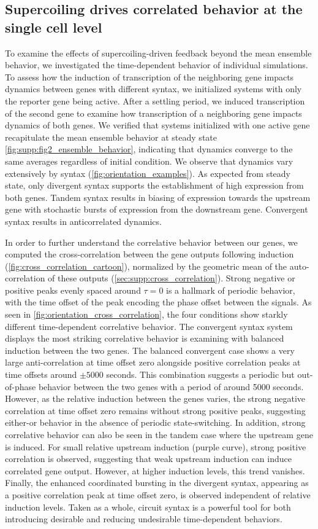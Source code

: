 \documentclass[11pt]{article}
\begin{document}
\subsection{Supercoiling drives correlated behavior at the single cell level}
To examine the effects of supercoiling-driven feedback beyond the mean ensemble behavior, we investigated the time-dependent behavior of individual simulations. To assess how the induction of transcription of the neighboring gene impacts dynamics between genes with different syntax,
we initialized systems  with only the reporter gene being active. After a settling period, we induced transcription of the second gene to examine how transcription of a neighboring gene impacts dynamics of both genes. We verified that systems initialized with one active gene recapitulate the mean ensemble behavior at steady state \cref{fig:supp:fig2_ensemble_behavior}, indicating that dynamics converge to the same averages regardless of initial condition. We observe that dynamics vary extensively by syntax (\cref{fig:orientation_examples}). As expected from steady state, only divergent syntax supports the establishment of high expression from both genes. Tandem syntax results in biasing of expression towards the upstream gene with stochastic bursts of expression from the downstream gene. Convergent syntax results in anticorrelated dynamics. 

In order to further understand the correlative behavior between our genes, we computed the cross-correlation between the gene outputs following induction (\cref{fig:cross_correlation_cartoon}), normalized by the geometric mean of the auto-correlation of these outputs (\cref{sec:supp:cross_correlation}).  Strong negative or positive peaks evenly spaced around \(\tau = 0\) is a hallmark of periodic behavior, with the time offset of the peak encoding the phase offset between the signals.
As seen in \cref{fig:orientation_cross_correlation}, the four conditions show starkly different time-dependent correlative behavior. The convergent syntax system displays the most striking correlative behavior is examining  with balanced induction between the two genes. The balanced convergent case shows a very large anti-correlation at time offset zero alongside positive correlation peaks at time offsets around \(\pm5000\) seconds. This combination suggests a periodic but out-of-phase behavior between the two genes with a period of around 5000 seconds. However, as the relative induction between the genes varies, the strong negative correlation at time offset zero remains without strong positive peaks, suggesting either-or behavior in the absence of periodic state-switching. In addition, strong correlative behavior can also be seen in the tandem case where the upstream gene is induced. For small relative upstream induction (purple curve), strong positive correlation is observed, suggesting that weak upstream induction can induce correlated gene output. However, at higher induction levels, this trend vanishes. Finally, the enhanced coordinated bursting in the divergent syntax, appearing as a positive correlation peak at time offset zero, is observed independent of relative induction levels.
Taken as a whole, circuit syntax is a powerful tool for both introducing desirable and reducing undesirable time-dependent behaviors.
\end{document}
